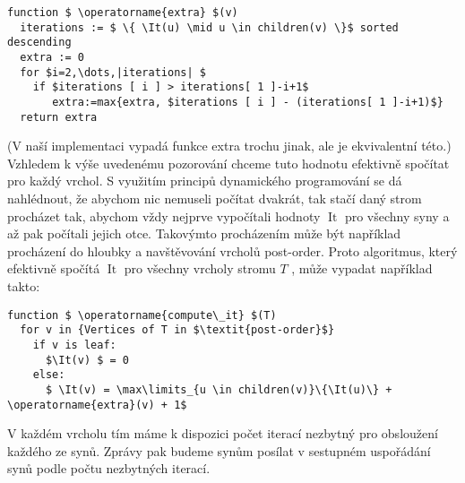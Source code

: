 \documentclass[12pt,a4paper]{article}
\theoremstyle{plain}
\newcommand{\It}{\operatorname{It}}
\begin{document}
\begin{lstlisting}[mathescape]
function $ \operatorname{extra} $(v)
  iterations := $ \{ \It(u) \mid u \in children(v) \}$ sorted descending
  extra := 0
  for $i=2,\dots,|iterations| $
    if $iterations [ i ] > iterations[ 1 ]-i+1$
       extra:=max{extra, $iterations [ i ] - (iterations[ 1 ]-i+1)$}
  return extra
\end{lstlisting}

(V naší implementaci vypadá funkce extra trochu jinak, ale je ekvivalentní této.)\\

Vzhledem k výše uvedenému pozorování chceme tuto hodnotu efektivně spočítat pro každý vrchol. S využitím principů dynamického programování se dá nahlédnout, že abychom nic nemuseli počítat dvakrát, tak stačí daný strom procházet tak, abychom vždy nejprve vypočítali hodnoty $ \It $ pro všechny syny a až pak počítali jejich otce. Takovýmto procházením může být například procházení do hloubky a navštěvování vrcholů post-order. Proto algoritmus, který efektivně spočítá $ \It $ pro všechny vrcholy stromu $ T $ , může vypadat například takto:

\begin{lstlisting}[mathescape]
function $ \operatorname{compute\_it} $(T)
  for v in {Vertices of T in $\textit{post-order}$}
    if v is leaf:
      $\It(v) $ = 0
    else:
      $ \It(v) = \max\limits_{u \in children(v)}\{\It(u)\} + \operatorname{extra}(v) + 1$
\end{lstlisting}

V každém vrcholu tím máme k dispozici počet iterací nezbytný pro obsloužení každého ze synů. Zprávy pak budeme synům posílat v sestupném uspořádání synů podle počtu nezbytných iterací.\\
\end{document}
